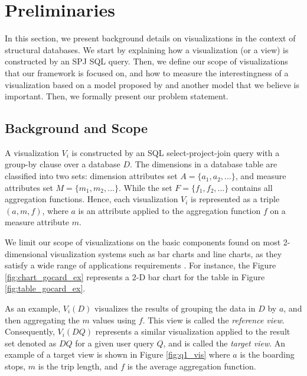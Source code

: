\section{Preliminaries}
\label{sec:prelim}
%
%
In this section, we present background details on visualizations in the context of structural databases.
%
We start by explaining how a visualization (or a view) is constructed by an SPJ SQL query. 
%
Then, we define our scope of visualizations that our framework is focused on, and how to measure the interestingness of a visualization based on a model proposed by \cite{DBLP:journals/pvldb/VartakMPP14} and another model that we believe is important.
%
Then, we formally present our problem statement.
%

\subsection{Background and Scope}
%
A visualization $V_i$ is constructed by an SQL select-project-join query with a group-by clause over a database $D$.
% 
The dimensions in a database table are classified into two sets: dimension attributes set $A=\{a_1, a_2, ...\}$, and measure attributes set $M=\{m_1, m_2, ... \}$. While the set $F=\{f_1, f_2, ... \}$ contains all aggregation functions.
%
Hence, each visualization $V_i$ is represented as a triple $(a, m, f)$, where $a$ is an attribute applied to the aggregation function $f$ on a measure attribute $m$.
% 

%
We limit our scope of visualizations on the basic components found on most 2-dimensional visualization systems such as bar charts and line charts, as they satisfy a wide range of applications requirements \cite{Jugel:2016:VAV:2884416.2884424}. 
%
For instance, the Figure \ref{fig:chart_gocard_ex} represents a 2-D bar chart for the table in Figure \ref{fig:table_gocard_ex}.
%

As an example, $V_i(D)$ visualizes the results of grouping the data in $D$ by $a$, and then 
aggregating the $m$ values using $f$. 
%
This view is called the \emph{reference view}.
%
Consequently, $V_i(DQ)$ represents a similar visualization applied to the result set denoted as $DQ$ for a given user query $Q$, and is called the \emph{target view}.
%
An example of a target view is shown in Figure \ref{fig:q1_vis} where $a$ is the boarding stops, $m$ is the trip length, and $f$ is the average aggregation function.
%

